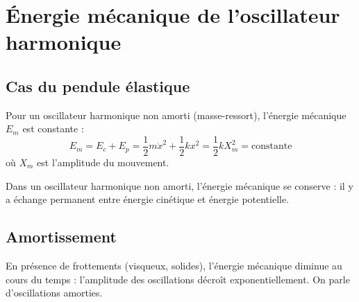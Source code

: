 \section{Énergie mécanique de l'oscillateur harmonique}

\subsection{Cas du pendule élastique}

\begin{propriete}
Pour un oscillateur harmonique non amorti (masse-ressort), l'énergie mécanique $E_m$ est constante :
\[
E_m = E_c + E_p = \frac{1}{2}m\dot{x}^2 + \frac{1}{2}k x^2 = \frac{1}{2}k X_m^2 = \text{constante}
\]
où $X_m$ est l'amplitude du mouvement.
\end{propriete}

\begin{illus}
\end{illus}

\begin{aretenir}
Dans un oscillateur harmonique non amorti, l'énergie mécanique se conserve : il y a échange permanent entre énergie cinétique et énergie potentielle.
\end{aretenir}

\subsection{Amortissement}

\begin{definition}
En présence de frottements (visqueux, solides), l'énergie mécanique diminue au cours du temps : l'amplitude des oscillations décroît exponentiellement. On parle d'oscillations amorties.
\end{definition}

